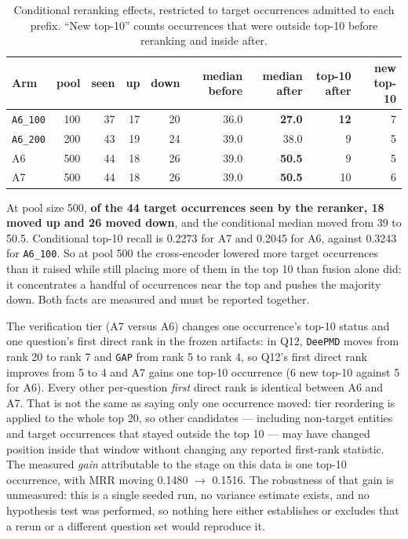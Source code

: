 \documentclass[11pt,a4paper]{article}
\begin{document}
\begin{table}[htbp]
\centering
\small
\caption{Conditional reranking effects, restricted to target occurrences admitted to each prefix.
``New top-10'' counts occurrences that were outside top-10 before reranking and inside after.}
\label{tab:cond}
\begin{tabular}{lrrrrrrrr}
\toprule
Arm & pool & seen & up & down & median before & median after & top-10 after & new top-10 \\
\midrule
\texttt{A6\_100} & 100 & 37 & 17 & 20 & 36.0 & \textbf{27.0} & \textbf{12} & 7 \\
\texttt{A6\_200} & 200 & 43 & 19 & 24 & 39.0 & 38.0 & 9 & 5 \\
A6               & 500 & 44 & 18 & 26 & 39.0 & \textbf{50.5} & 9 & 5 \\
A7               & 500 & 44 & 18 & 26 & 39.0 & \textbf{50.5} & 10 & 6 \\
\bottomrule
\end{tabular}
\end{table}

At pool size 500, \textbf{of the 44 target occurrences seen by the reranker, 18 moved up and 26 moved down},
and the conditional median moved from 39 to 50.5. Conditional top-10 recall is 0.2273 for A7 and 0.2045 for
A6, against 0.3243 for \texttt{A6\_100}. So at pool 500 the cross-encoder lowered more target occurrences
than it raised while still placing more of them in the top 10 than fusion alone did: it concentrates a
handful of occurrences near the top and pushes the majority down. Both facts are measured and must be
reported together.

The verification tier (A7 versus A6) changes one occurrence's top-10 status and one question's first direct
rank in the frozen artifacts: in Q12, \texttt{DeePMD} moves from rank 20 to rank 7 and \texttt{GAP} from
rank 5 to rank 4, so Q12's first direct rank improves from 5 to 4 and A7 gains one top-10 occurrence (6 new
top-10 against 5 for A6). Every other per-question \emph{first} direct rank is identical between A6 and A7.
That is not the same as saying only one occurrence moved: tier reordering is applied to the whole top 20, so
other candidates --- including non-target entities and target occurrences that stayed outside the top 10 ---
may have changed position inside that window without changing any reported first-rank statistic. The
measured \emph{gain} attributable to the stage on this data is one top-10 occurrence, with MRR moving
0.1480 $\to$ 0.1516. The robustness of that gain is unmeasured: this is a single seeded run, no variance
estimate exists, and no hypothesis test was performed, so nothing here either establishes or excludes that a
rerun or a different question set would reproduce it.
\end{document}
